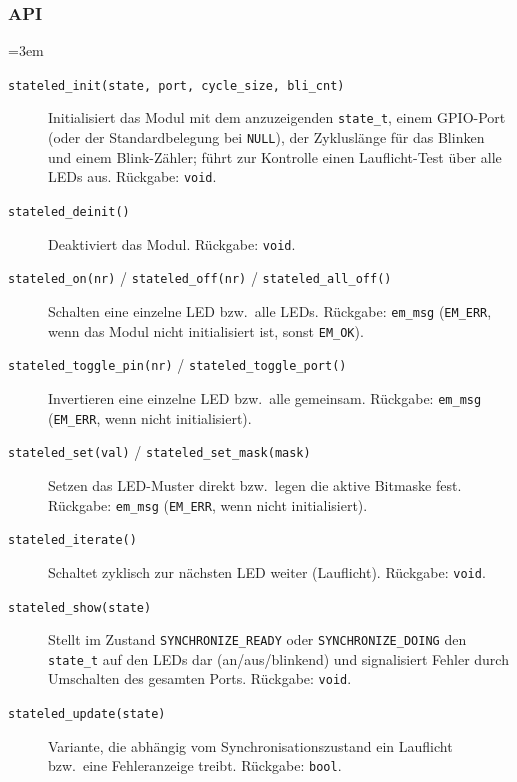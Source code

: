 \subsubsection*{API}
{\sloppy\emergencystretch=3em
\begin{description}
\item[\texttt{stateled\_init(state, port, cycle\_size, bli\_cnt)}]
  Initialisiert das Modul mit dem anzuzeigenden \verb|state_t|, einem
  GPIO-Port (oder der Standardbelegung bei \verb|NULL|), der Zykluslänge für
  das Blinken und einem Blink-Zähler; führt zur Kontrolle einen Lauflicht-Test
  über alle LEDs aus. Rückgabe: \verb|void|.
\item[\texttt{stateled\_deinit()}] Deaktiviert das Modul. Rückgabe:
  \verb|void|.
\item[\texttt{stateled\_on(nr)} / \texttt{stateled\_off(nr)} /
  \texttt{stateled\_all\_off()}] Schalten eine einzelne LED bzw.\ alle LEDs.
  Rückgabe: \verb|em_msg| (\verb|EM_ERR|, wenn das Modul nicht initialisiert
  ist, sonst \verb|EM_OK|).
\item[\texttt{stateled\_toggle\_pin(nr)} / \texttt{stateled\_toggle\_port()}]
  Invertieren eine einzelne LED bzw.\ alle gemeinsam. Rückgabe: \verb|em_msg|
  (\verb|EM_ERR|, wenn nicht initialisiert).
\item[\texttt{stateled\_set(val)} / \texttt{stateled\_set\_mask(mask)}] Setzen
  das LED-Muster direkt bzw.\ legen die aktive Bitmaske fest. Rückgabe:
  \verb|em_msg| (\verb|EM_ERR|, wenn nicht initialisiert).
\item[\texttt{stateled\_iterate()}] Schaltet zyklisch zur nächsten LED weiter
  (Lauflicht). Rückgabe: \verb|void|.
\item[\texttt{stateled\_show(state)}] Stellt im Zustand
  \verb|SYNCHRONIZE_READY| oder \verb|SYNCHRONIZE_DOING| den \verb|state_t| auf
  den LEDs dar (an/aus/blinkend) und signalisiert Fehler durch Umschalten des
  gesamten Ports. Rückgabe: \verb|void|.
\item[\texttt{stateled\_update(state)}] Variante, die abhängig vom
  Synchronisationszustand ein Lauflicht bzw.\ eine Fehleranzeige treibt.
  Rückgabe: \verb|bool|.
\end{description}
\par}
